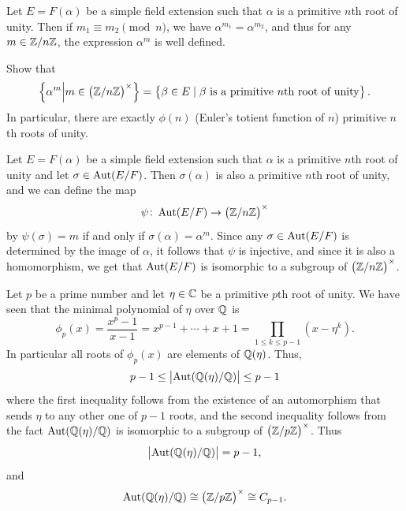 \documentclass[11pt,a4paper]{article}
\begin{document}
\begin{remark}
  Let $E = F(\alpha)$ be a simple field extension such that $\alpha$
  is a primitive $n$th root of unity.
  Then if $m_1 \equiv m_2 \pmod n$,
  we have $\alpha^{m_1} = \alpha^{m_2}$,
  and thus for any $m \in \mathbb{Z}/n\mathbb{Z}$, the expression $\alpha^{m}$ is well defined.
\end{remark}

\begin{exercise}
  Show that
  \[
    \set{\alpha^m \middle\vert m \in \del{\Z/n\Z}^{\times}} =
    \set{\beta \in E \mid \beta \text{ is a primitive $n$th root of unity}}.
  \]
  In particular, there are exactly $\phi(n)$ (Euler's totient function of $n$)
  primitive $n$th roots of unity.
\end{exercise}

\begin{example}
  Let $E = F(\alpha)$ be a simple field extension such that $\alpha$
  is a primitive $n$th root of unity
  and let $\sigma \in \operatorname{Aut}(E/F)$.
  Then $\sigma(\alpha)$ is also a primitive $n$th root of unity,
  and we can define the map
  \[
    \psi \colon \Aut(E/F) \to \del{\Z/n\Z}^{\times}
  \]
  by $\psi(\sigma) = m$ if and only if $\sigma(\alpha) = \alpha^m$.
  Since any $\sigma \in \operatorname{Aut}(E/F)$ is determined by the image of $\alpha$,
  it follows that $\psi$ is injective,
  and since it is also a homomorphism, we get that $\operatorname{Aut}(E/F)$
  is isomorphic to a subgroup of $\del{\Z/n\Z}^{\times}$.
\end{example}

\begin{example}
  \label{exmp:p-one}
  Let $p$ be a prime number and let $\eta \in \mathbb{C}$ be a primitive $p$th root
  of unity.
  We have seen that the minimal polynomial of $\eta$ over $\mathbb{Q}$ is
  \[
    \phi_p(x) =
    \frac{x^p - 1}{x-1} =
    x^{p-1} + \cdots + x + 1 =
    \prod_{1 \le k \le p - 1} (x - \eta^k).
  \]
  In particular all roots of $\phi_p(x)$ are elements of $\mathbb{Q}(\eta)$.
  Thus,
  \[
    p - 1 \le \left\lvert\operatorname{Aut}(\mathbb{Q}(\eta)/\mathbb{Q})\right\rvert \le p - 1
  \]
  where the first inequality follows
  from the existence of an automorphism that sends $\eta$
  to any other one of $p - 1$ roots,
  and the second inequality follows from the fact
  $\operatorname{Aut}(\mathbb{Q}(\eta)/\mathbb{Q})$ is isomorphic
  to a subgroup of $\del{\Z/p\Z}^{\times}$.
  Thus
  \[
    \left\lvert\operatorname{Aut}(\mathbb{Q}(\eta)/\mathbb{Q})\right\rvert = p - 1,
  \]
  and
  \[
    \Aut(\Q(\eta)/\Q) \cong \del{\Z/p\Z}^{\times} \cong C_{p-1}.
  \]
\end{example}
\end{document}
